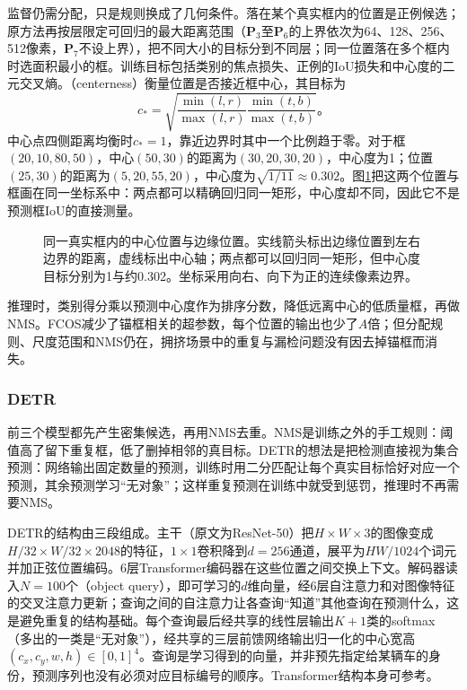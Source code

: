 监督仍需分配，只是规则换成了几何条件。落在某个真实框内的位置是正例候选；原方法再按层限定可回归的最大距离范围（$\bm{P}_3$至$\bm{P}_6$的上界依次为64、128、256、512像素，$\bm{P}_7$不设上界），把不同大小的目标分到不同层；同一位置落在多个框内时选面积最小的框。训练目标包括类别的焦点损失、正例的IoU损失和中心度的二元交叉熵。（centerness）衡量位置是否接近框中心，其目标为
\begin{equation}
 c_*=\sqrt{\frac{\min(l,r)}{\max(l,r)}
                 \frac{\min(t,b)}{\max(t,b)}}\text{。}
 \label{eq:vision-fcos-centerness}
\end{equation}
中心点四侧距离均衡时$c_*=1$，靠近边界时其中一个比例趋于零。对于框$(20,10,80,50)$，中心$(50,30)$的距离为$(30,20,30,20)$，中心度为1；位置$(25,30)$的距离为$(5,20,55,20)$，中心度为$\sqrt{1/11}\approx0.302$。图\ref{fig:vision-box-points}把这两个位置与框画在同一坐标系中：两点都可以精确回归同一矩形，中心度却不同，因此它不是预测框IoU的直接测量。

\begin{figure}[htbp]
 \centering
 
 \caption{同一真实框内的中心位置与边缘位置。实线箭头标出边缘位置到左右边界的距离，虚线标出中心轴；两点都可以回归同一矩形，但中心度目标分别为1与约0.302。坐标采用向右、向下为正的连续像素边界。}
 \label{fig:vision-box-points}
\end{figure}

推理时，类别得分乘以预测中心度作为排序分数，降低远离中心的低质量框，再做NMS。FCOS减少了锚框相关的超参数，每个位置的输出也少了$A$倍；但分配规则、尺度范围和NMS仍在，拥挤场景中的重复与漏检问题没有因去掉锚框而消失。

\subsubsection{DETR}
\label{sec:vision-recognition-detr}

前三个模型都先产生密集候选，再用NMS去重。NMS是训练之外的手工规则：阈值高了留下重复框，低了删掉相邻的真目标。DETR的想法是把检测直接视为集合预测：网络输出固定数量的预测，训练时用二分匹配让每个真实目标恰好对应一个预测，其余预测学习“无对象”；这样重复预测在训练中就受到惩罚，推理时不再需要NMS。

DETR的结构由三段组成。主干（原文为ResNet-50）把$H\times W\times3$的图像变成$H/32\times W/32\times2048$的特征，$1\times1$卷积降到$d=256$通道，展平为$HW/1024$个词元并加正弦位置编码。6层Transformer编码器在这些位置之间交换上下文。解码器读入$N=100$个（object query），即可学习的$d$维向量，经6层自注意力和对图像特征的交叉注意力更新；查询之间的自注意力让各查询“知道”其他查询在预测什么，这是避免重复的结构基础。每个查询最后经共享的线性层输出$K+1$类的softmax（多出的一类是“无对象”），经共享的三层前馈网络输出归一化的中心宽高$(c_x,c_y,w,h)\in[0,1]^4$。查询是学习得到的向量，并非预先指定给某辆车的身份，预测序列也没有必须对应目标编号的顺序。Transformer结构本身可参考。

